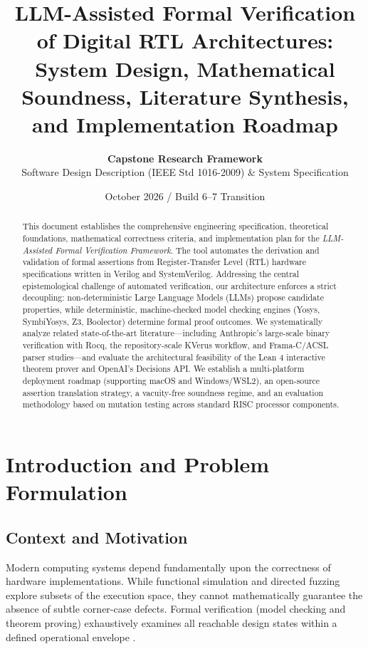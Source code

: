 \documentclass[11pt,a4paper]{article}
\title{\textbf{LLM-Assisted Formal Verification of Digital RTL Architectures:}\\
\large System Design, Mathematical Soundness, Literature Synthesis, and Implementation Roadmap}
\author{\textbf{Capstone Research Framework}\\
Software Design Description (IEEE Std 1016-2009) \& System Specification}
\date{October 2026 / Build 6--7 Transition}
\begin{document}
\maketitle

\begin{abstract}
This document establishes the comprehensive engineering specification, theoretical foundations, mathematical correctness criteria, and implementation plan for the \textit{LLM-Assisted Formal Verification Framework}. The tool automates the derivation and validation of formal assertions from Register-Transfer Level (RTL) hardware specifications written in Verilog and SystemVerilog. Addressing the central epistemological challenge of automated verification, our architecture enforces a strict decoupling: non-deterministic Large Language Models (LLMs) propose candidate properties, while deterministic, machine-checked model checking engines (Yosys, SymbiYosys, Z3, Boolector) determine formal proof outcomes. We systematically analyze related state-of-the-art literature---including Anthropic's large-scale binary verification with Rocq, the repository-scale KVerus workflow, and Frama-C/ACSL parser studies---and evaluate the architectural feasibility of the Lean 4 interactive theorem prover and OpenAI's Decisions API. We establish a multi-platform deployment roadmap (supporting macOS and Windows/WSL2), an open-source assertion translation strategy, a vacuity-free soundness regime, and an evaluation methodology based on mutation testing across standard RISC processor components.
\end{abstract}

\tableofcontents
\newpage

\section{Introduction and Problem Formulation}

\subsection{Context and Motivation}
Modern computing systems depend fundamentally upon the correctness of hardware implementations. While functional simulation and directed fuzzing explore subsets of the execution space, they cannot mathematically guarantee the absence of subtle corner-case defects. Formal verification (model checking and theorem proving) exhaustively examines all reachable design states within a defined operational envelope \cite{biere2003bounded}.
\end{document}
